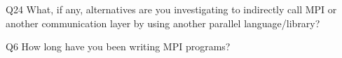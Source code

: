 \begin{description}%
\item{Q24} What, if any, alternatives are you investigating to indirectly call MPI or another communication layer by using another parallel language/library?%
\item{Q6} How long have you been writing MPI programs?%
\end{description}%
